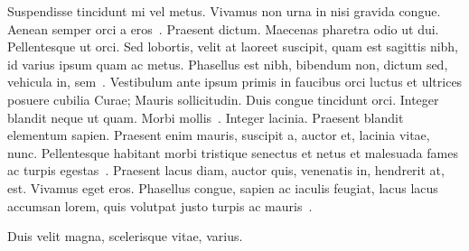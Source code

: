 Suspendisse tincidunt mi vel metus. Vivamus non urna in nisi gravida congue.
Aenean semper orci a eros~\cite{david-2021,david-2023}. Praesent dictum.
Maecenas pharetra odio ut dui. Pellentesque ut orci. Sed lobortis, velit at
laoreet suscipit, quam est sagittis nibh, id varius ipsum quam ac metus.
Phasellus est nibh, bibendum non, dictum sed, vehicula in,
sem~\cite{GaumontVFWL15,VFLM18}. Vestibulum ante ipsum primis in faucibus orci
luctus et ultrices posuere cubilia Curae; Mauris sollicitudin. Duis congue
tincidunt orci. Integer blandit neque ut quam. Morbi
mollis~\cite{VF19,VIARD2019127}. Integer lacinia. Praesent blandit elementum
sapien. Praesent enim mauris, suscipit a, auctor et, lacinia vitae, nunc.
Pellentesque habitant morbi tristique senectus et netus et malesuada fames ac
turpis egestas~\cite{karmim22}. Praesent lacus diam, auctor quis, venenatis in,
hendrerit at, est. Vivamus eget eros. Phasellus congue, sapien ac iaculis
feugiat, lacus lacus accumsan lorem, quis volutpat justo turpis ac
mauris~\cite{dang:hal-03324009}.

Duis velit magna, scelerisque vitae, varius.
